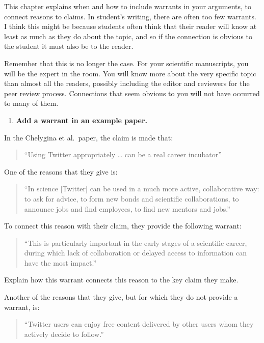 \documentclass[]{tufte-book}
\providecommand{\tightlist}{%
  \setlength{\itemsep}{0pt}\setlength{\parskip}{0pt}}
\begin{document}
This chapter explains when and how to include warrants in your arguments, to
connect reasons to claims. In student's writing, there are often too few warrants.
I think this might be because students often think that their reader will know
at least as much as they do about the topic, and so if the connection is obvious
to the student it must also be to the reader.

Remember that this is no longer the case. For your scientific manuscripts, you
will be the expert in the room. You will know more about the very specific topic
than almost all the readers, possibly including the editor and reviewers for the
peer review process. Connections that seem obvious to you will not have occurred
to many of them.

\begin{enumerate}
\def\labelenumi{\arabic{enumi}.}
\setcounter{enumi}{7}
\tightlist
\item
  \textbf{Add a warrant in an example paper.}
\end{enumerate}

In the Chelygina et al.~paper, the claim is made that:

\begin{quote}
``Using Twitter appropriately \ldots{} can be a real career incubator''
\end{quote}

One of the reasons that they give is:

\begin{quote}
``In science {[}Twitter{]} can be used in a much more active,
collaborative way: to ask for advice, to form new bonds and scientific
collaborations, to announce jobs and find employees, to find new mentors and
jobs.''
\end{quote}

To connect this reason with their claim, they provide the following warrant:

\begin{quote}
``This is particularly important in the early stages of a scientific career,
during which lack of collaboration or delayed access to information can have the
most impact.''
\end{quote}

Explain how this warrant connects this reason to the key claim they make.

Another of the reasons that they give, but for which they do not provide a
warrant, is:

\begin{quote}
``Twitter users can enjoy free content delivered by other users whom they
actively decide to follow.''
\end{quote}
\end{document}
